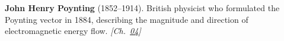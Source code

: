 \textbf{John Henry Poynting} (1852–1914). British physicist who formulated the Poynting vector in 1884, describing the magnitude and direction of electromagnetic energy flow. \emph{[Ch.~\hyperref[ch:energytransmission]{04}]}

